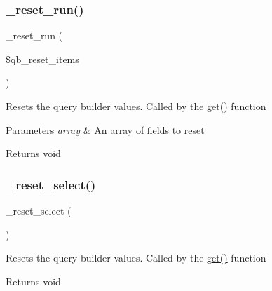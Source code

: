 \subsubsection{\texorpdfstring{\+\_\+reset\+\_\+run()}{\_reset\_run()}}
{\footnotesize\ttfamily \+\_\+reset\+\_\+run (\begin{DoxyParamCaption}\item[{}]{\$qb\+\_\+reset\+\_\+items }\end{DoxyParamCaption})\hspace{0.3cm}{\ttfamily [protected]}}

Resets the query builder values. Called by the \mbox{\hyperlink{class_c_i___d_b__query__builder_a02c629b7cdb54c95ccc23c21d910320d}{get()}} function


\begin{DoxyParams}{Parameters}
{\em array} & An array of fields to reset \\
\hline
\end{DoxyParams}
\begin{DoxyReturn}{Returns}
void 
\end{DoxyReturn}
\mbox{\label{class_c_i___d_b__query__builder_a7c6cc16411b9c36fbfd42a9317f64317}} 
\subsubsection{\texorpdfstring{\+\_\+reset\+\_\+select()}{\_reset\_select()}}
{\footnotesize\ttfamily \+\_\+reset\+\_\+select (\begin{DoxyParamCaption}{ }\end{DoxyParamCaption})\hspace{0.3cm}{\ttfamily [protected]}}

Resets the query builder values. Called by the \mbox{\hyperlink{class_c_i___d_b__query__builder_a02c629b7cdb54c95ccc23c21d910320d}{get()}} function

\begin{DoxyReturn}{Returns}
void 
\end{DoxyReturn}
\mbox{\label{class_c_i___d_b__query__builder_ae49808f6becc0366eef957756c8309e4}} 
